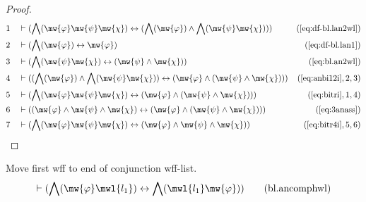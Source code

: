 \begin{proof}
\begin{align}
  1 &&  & \vdash ( \bigwedge( \mw{\varphi} \mw{\psi} \mw{\chi} )
     \leftrightarrow ( \bigwedge( \mw{\varphi} ) \wedge
     \bigwedge( \mw{\psi} \mw{\chi} ) )
     )&(\mbox{\ref{eq:df-bl.lan2wl}})\notag
  \\ 2 &&  & \vdash ( \bigwedge( \mw{\varphi} ) \leftrightarrow \mw{\varphi}
     )&(\mbox{\ref{eq:df-bl.lan1}})\notag
  \\ 3 &&  & \vdash ( \bigwedge( \mw{\psi} \mw{\chi} ) \leftrightarrow (
     \mw{\psi} \wedge \mw{\chi} )
     )&(\mbox{\ref{eq:bl.an2wl}})\notag
  \\ 4 &&  & \vdash ( ( \bigwedge( \mw{\varphi} ) \wedge \bigwedge( \mw{\psi}
     \mw{\chi} ) ) \leftrightarrow ( \mw{\varphi} \wedge (
     \mw{\psi} \wedge \mw{\chi} ) )
     )&(\mbox{\ref{eq:anbi12i}},2,3)\notag
  \\ 5 &&  & \vdash ( \bigwedge( \mw{\varphi} \mw{\psi} \mw{\chi} )
     \leftrightarrow ( \mw{\varphi} \wedge ( \mw{\psi}
     \wedge \mw{\chi} ) )
     )&(\mbox{\ref{eq:bitri}},1,4)\notag
  \\ 6 &&  & \vdash ( ( \mw{\varphi} \wedge \mw{\psi} \wedge \mw{\chi} )
     \leftrightarrow ( \mw{\varphi} \wedge ( \mw{\psi}
     \wedge \mw{\chi} ) ) )&(\mbox{\ref{eq:3anass}})\notag
  \\ 7 &&  & \vdash ( \bigwedge( \mw{\varphi} \mw{\psi} \mw{\chi} )
     \leftrightarrow ( \mw{\varphi} \wedge \mw{\psi}
     \wedge \mw{\chi} )
     )&(\mbox{\ref{eq:bitr4i}},5,6)\notag
\end{align}
\end{proof}

\begin{lemma} {Move first wff to end of conjunction
wff-list.}
\begin{align}
\vdash ( \bigwedge( \mw{\varphi} \mwl{l_1} ) \leftrightarrow \bigwedge(
    \mwl{l_1} \mw{\varphi} ) )\label{eq:bl.ancomphwl}\tag{bl.ancomphwl}
\end{align}
\end{lemma}


